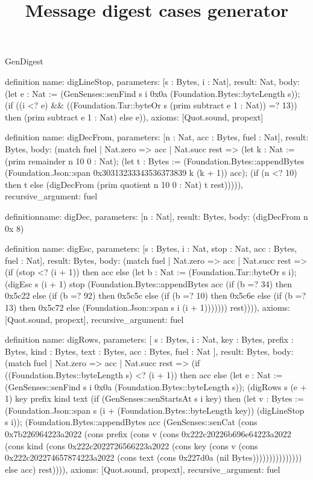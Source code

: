 \begin{lexlean}{GenDigest}
\title{Message digest cases generator}
\begin{semanticmodule}
definition{
  name: digLineStop,
  parameters: [s : Bytes, i : Nat],
  result: Nat,
  body: (let e : Nat := (GenSenses::senFind s i 0x0a (Foundation.Bytes::byteLength s)); (if ((i <? e) && ((Foundation.Tar::byteOr s (prim subtract e 1 : Nat)) =? 13)) then (prim subtract e 1 : Nat) else e)),
  axioms: [Quot.sound, propext]
}

definition{
  name: digDecFrom,
  parameters: [n : Nat, acc : Bytes, fuel : Nat],
  result: Bytes,
  body: (match fuel
    | Nat.zero => acc
    | Nat.succ rest => (let k : Nat := (prim remainder n 10 0 : Nat); (let t : Bytes := (Foundation.Bytes::appendBytes (Foundation.Json::span 0x30313233343536373839 k (k + 1)) acc); (if (n <? 10) then t else (digDecFrom (prim quotient n 10 0 : Nat) t rest))))),
  recursive_argument: fuel
}

definition{name: digDec, parameters: [n : Nat], result: Bytes, body: (digDecFrom n 0x 8)}

definition{
  name: digEsc,
  parameters: [s : Bytes, i : Nat, stop : Nat, acc : Bytes, fuel : Nat],
  result: Bytes,
  body: (match fuel
    | Nat.zero => acc
    | Nat.succ rest => (if (stop <? (i + 1)) then acc else (let b : Nat := (Foundation.Tar::byteOr s i); (digEsc s (i + 1) stop (Foundation.Bytes::appendBytes acc (if (b =? 34) then 0x5c22 else (if (b =? 92) then 0x5c5c else (if (b =? 10) then 0x5c6e else (if (b =? 13) then 0x5c72 else (Foundation.Json::span s i (i + 1))))))) rest)))),
  axioms: [Quot.sound, propext],
  recursive_argument: fuel
}

definition{
  name: digRows,
  parameters: [
    s : Bytes,
    i : Nat,
    key : Bytes,
    prefix : Bytes,
    kind : Bytes,
    text : Bytes,
    acc : Bytes,
    fuel : Nat
  ],
  result: Bytes,
  body: (match fuel
    | Nat.zero => acc
    | Nat.succ rest => (if ((Foundation.Bytes::byteLength s) <? (i + 1)) then acc else (let e : Nat := (GenSenses::senFind s i 0x0a (Foundation.Bytes::byteLength s)); (digRows s (e + 1) key prefix kind text (if (GenSenses::senStartsAt s i key) then (let v : Bytes := (Foundation.Json::span s (i + (Foundation.Bytes::byteLength key)) (digLineStop s i)); (Foundation.Bytes::appendBytes acc (GenSenses::senCat (cons 0x7b226964223a2022 (cons prefix (cons v (cons 0x222c20226b696e64223a2022 (cons kind (cons 0x222c2022726566223a2022 (cons key (cons v (cons 0x222c202274657874223a2022 (cons text (cons 0x227d0a (nil Bytes))))))))))))))) else acc) rest)))),
  axioms: [Quot.sound, propext],
  recursive_argument: fuel
}


\end{semanticmodule}
\end{lexlean}
